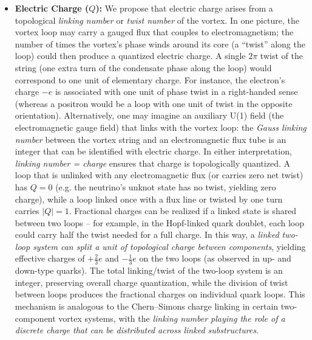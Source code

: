 \documentclass[12pt]{article}
\begin{document}
\begin{itemize}
    \item \textbf{Electric Charge ($Q$):} We propose that electric charge arises from a topological \emph{linking number} or \emph{twist number} of the vortex. In one picture, the vortex loop may carry a gauged flux that couples to electromagnetism; the number of times the vortex’s phase winds around its core (a “twist” along the loop) could then produce a quantized electric charge. A single $2\pi$ twist of the string (one extra turn of the condensate phase along the loop) would correspond to one unit of elementary charge. For instance, the electron’s charge $-e$ is associated with one unit of phase twist in a right-handed sense (whereas a positron would be a loop with one unit of twist in the opposite orientation). Alternatively, one may imagine an auxiliary U(1) field (the electromagnetic gauge field) that links with the vortex loop: the \emph{Gauss linking number} between the vortex string and an electromagnetic flux tube is an integer that can be identified with electric charge\cite{arxiv2407.11731}. In either interpretation, \emph{linking number = charge} ensures that charge is topologically quantized. A loop that is unlinked with any electromagnetic flux (or carries zero net twist) has $Q=0$ (e.g. the neutrino’s unknot state has no twist, yielding zero charge), while a loop linked once with a flux line or twisted by one turn carries $|Q|=1$. Fractional charges can be realized if a linked state is shared between two loops – for example, in the Hopf-linked quark doublet, each loop could carry half the twist needed for a full charge. In this way, a \emph{linked two-loop system can split a unit of topological charge between components}, yielding effective charges of $+\tfrac{2}{3}e$ and $-\tfrac{1}{3}e$ on the two loops (as observed in up- and down-type quarks). The total linking/twist of the two-loop system is an integer, preserving overall charge quantization, while the division of twist between loops produces the fractional charges on individual quark loops. This mechanism is analogous to the Chern–Simons charge linking in certain two-component vortex systems\cite{arxiv2407.11731}, with the \emph{linking number playing the role of a discrete charge that can be distributed across linked substructures}.

\end{itemize}
\end{document}
